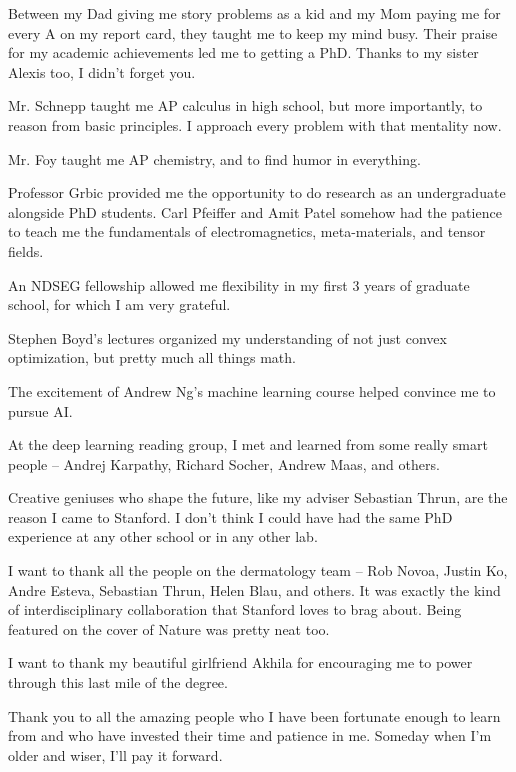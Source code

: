Between my Dad giving me story problems as a kid and my Mom paying me for every A on my report card, they taught me to keep my mind busy.  Their praise for my academic achievements led me to getting a PhD.  Thanks to my sister Alexis too, I didn't forget you.

Mr. Schnepp taught me AP calculus in high school, but more importantly, to reason from basic principles.  I approach every problem with that mentality now.

Mr. Foy taught me AP chemistry, and to find humor in everything.

Professor Grbic provided me the opportunity to do research as an undergraduate alongside PhD students.  Carl Pfeiffer and Amit Patel somehow had the patience to teach me the fundamentals of electromagnetics, meta-materials, and tensor fields.

An NDSEG fellowship allowed me flexibility in my first 3 years of graduate school, for which I am very grateful.

Stephen Boyd's lectures organized my understanding of not just convex optimization, but pretty much all things math.

The excitement of Andrew Ng's machine learning course helped convince me to pursue AI.

At the deep learning reading group, I met and learned from some really smart people -- Andrej Karpathy, Richard Socher, Andrew Maas, and others.

Creative geniuses who shape the future, like my adviser Sebastian Thrun, are the reason I came to Stanford.  I don't think I could have had the same PhD experience at any other school or in any other lab.

I want to thank all the people on the dermatology team -- Rob Novoa, Justin Ko, Andre Esteva, Sebastian Thrun, Helen Blau, and others.  It was exactly the kind of interdisciplinary collaboration that Stanford loves to brag about.  Being featured on the cover of Nature was pretty neat too.

I want to thank my beautiful girlfriend Akhila for encouraging me to power through this last mile of the degree.

Thank you to all the amazing people who I have been fortunate enough to learn from and who have invested their time and patience in me.  Someday when I’m older and wiser, I’ll pay it forward.